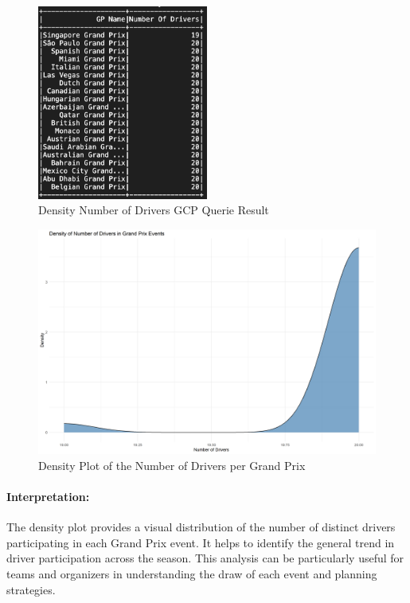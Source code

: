 \documentclass{article}
\begin{document}
\begin{figure}[H]
    \centering
    \includegraphics[width=0.5\textwidth]{ss-driver-num.png}
    \caption{Density Number of Drivers GCP Querie Result}
\end{figure}

\begin{figure}[H]
    \centering
    \includegraphics[width=\textwidth]{drivers_density.png}
    \caption{Density Plot of the Number of Drivers per Grand Prix}
\end{figure}

\paragraph{Interpretation:}
The density plot provides a visual distribution of the number of distinct drivers participating in each Grand Prix event. It helps to identify the general trend in driver participation across the season. This analysis can be particularly useful for teams and organizers in understanding the draw of each event and planning strategies.
\end{document}
